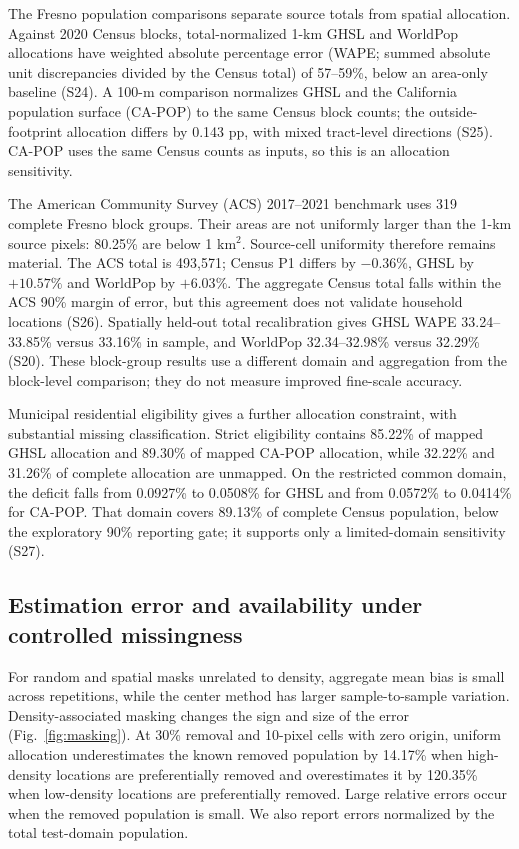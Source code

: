 \documentclass[pdflatex,lineno,sn-nature]{sn-jnl}
\begin{document}
The Fresno population comparisons separate source totals from spatial allocation. Against 2020 Census blocks, total-normalized 1-km GHSL and WorldPop allocations have weighted absolute percentage error (WAPE; summed absolute unit discrepancies divided by the Census total) of 57--59\%, below an area-only baseline (S24). A 100-m comparison normalizes GHSL and the California population surface (CA-POP) to the same Census block counts; the outside-footprint allocation differs by 0.143 pp, with mixed tract-level directions (S25). CA-POP uses the same Census counts as inputs, so this is an allocation sensitivity.

The American Community Survey (ACS) 2017--2021 benchmark uses 319 complete Fresno block groups. Their areas are not uniformly larger than the 1-km source pixels: 80.25\% are below 1 km$^2$. Source-cell uniformity therefore remains material. The ACS total is 493,571; Census P1 differs by $-0.36\%$, GHSL by $+10.57\%$ and WorldPop by $+6.03\%$. The aggregate Census total falls within the ACS 90\% margin of error, but this agreement does not validate household locations (S26). Spatially held-out total recalibration gives GHSL WAPE 33.24--33.85\% versus 33.16\% in sample, and WorldPop 32.34--32.98\% versus 32.29\% (S20). These block-group results use a different domain and aggregation from the block-level comparison; they do not measure improved fine-scale accuracy.

Municipal residential eligibility gives a further allocation constraint, with substantial missing classification. Strict eligibility contains 85.22\% of mapped GHSL allocation and 89.30\% of mapped CA-POP allocation, while 32.22\% and 31.26\% of complete allocation are unmapped. On the restricted common domain, the deficit falls from 0.0927\% to 0.0508\% for GHSL and from 0.0572\% to 0.0414\% for CA-POP. That domain covers 89.13\% of complete Census population, below the exploratory 90\% reporting gate; it supports only a limited-domain sensitivity (S27).

\subsection{Estimation error and availability under controlled missingness}
For random and spatial masks unrelated to density, aggregate mean bias is small across repetitions, while the center method has larger sample-to-sample variation. Density-associated masking changes the sign and size of the error (Fig.~\ref{fig:masking}). At 30\% removal and 10-pixel cells with zero origin, uniform allocation underestimates the known removed population by 14.17\% when high-density locations are preferentially removed and overestimates it by 120.35\% when low-density locations are preferentially removed. Large relative errors occur when the removed population is small. We also report errors normalized by the total test-domain population.
\end{document}
